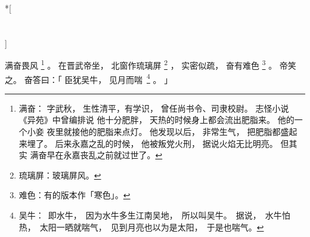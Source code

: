 
\switchcolumn[0]*[\section{}]

满奋畏风%
\footnote{%
    满奋：
        字武秋，
        生性清平，有学识，
        曾任尚书令、司隶校尉。
        志怪小说《异苑》中曾编排说
        他十分肥胖，
        天热的时候身上都会流出肥脂来。
        他的一个小妾
        夜里就接他的肥脂来点灯。
        他发现以后，
        非常生气，
        把肥脂都盛起来埋了。
        后来永嘉之乱的时候，
        他被叛党火刑，
        据说火焰无比明亮。
        但其实
        满奋早在永嘉丧乱之前就过世了。
}%
。
在晋武帝坐，
北窗作琉璃屏%
\footnote{%
    琉璃屏：玻璃屏风。
}%
，
实密似疏，
奋有难色%
\footnote{%
    难色：有的版本作「寒色」。
}%
。
帝笑之。
奋答曰：「
    臣犹吴牛，
    见月而\mbox{喘%
    \footnote{%
        吴牛：
            即水牛，
            因为水牛多生江南吴地，
            所以叫吴牛。
            据说，
            水牛怕热，
            太阳一晒就喘气，
            见到月亮也以为是太阳，
            于是也喘气。
    }}%
    。
」

\switchcolumn



